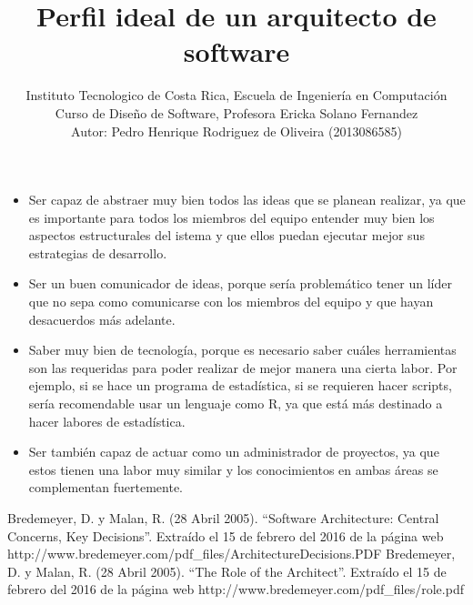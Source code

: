 \documentclass[a4paper,12pt]{article}
\begin{document}
\title{Perfil ideal de un arquitecto de software}
\date{}
\author{Instituto Tecnologico de Costa Rica, Escuela de Ingeniería en Computación\\
Curso de Diseño de Software, Profesora Ericka Solano Fernandez\\
Autor: Pedro Henrique Rodriguez de Oliveira (2013086585)}
\maketitle

\onehalfspacing
\begin{itemize}
  \item Ser capaz de abstraer muy bien todos las ideas que se planean realizar, ya que es importante para todos los miembros del equipo entender muy bien los aspectos estructurales del istema y que ellos puedan ejecutar mejor sus estrategias de desarrollo.
  \item Ser un buen comunicador de ideas, porque sería problemático tener un líder que no sepa como comunicarse con los miembros del equipo y que hayan desacuerdos más adelante.
  \item Saber muy bien de tecnología, porque es necesario saber cuáles herramientas son las requeridas para poder realizar de mejor manera una cierta labor. Por ejemplo, si se hace un programa de estadística, si se requieren hacer scripts, sería recomendable usar un lenguaje como R, ya que está más destinado a hacer labores de estadística.
  \item Ser también capaz de actuar como un administrador de proyectos, ya que estos tienen una labor muy similar y los conocimientos en ambas áreas se complementan fuertemente.
\end{itemize}

\begin{thebibliography}{50}
	 Bredemeyer, D. y Malan, R. (28 Abril 2005). “Software Architecture: Central Concerns, Key Decisions”. Extraído el 15 de febrero del 2016 de la página web http://www.bredemeyer.com/pdf\_files/ArchitectureDecisions.PDF
	 Bredemeyer, D. y Malan, R. (28 Abril 2005). “The Role of the Architect”. Extraído el 15 de febrero del 2016 de la página web http://www.bredemeyer.com/pdf\_files/role.pdf
\end{thebibliography}
\end{document}
